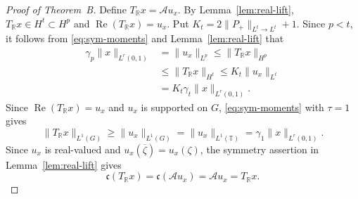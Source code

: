 \documentclass[10pt,a4paper]{amsart}
\newcommand{\T}{\mathbb{T}}
\newcommand{\R}{\mathbb{R}}
\begin{document}
\begin{proof}[Proof of Theorem~B]
Define \(T_{\R}x=\mathcal Au_x\). By
Lemma~\ref{lem:real-lift},
\(T_{\R}x\in H^t\subset H^p\) and
\(\operatorname{Re}(T_{\R}x)=u_x\). Put \(K_t=2\|P_+\|_{L^t\to L^t}+1\).  Since \(p<t\), it follows from
\eqref{eq:sym-moments} and
Lemma~\ref{lem:real-lift} that
\begin{equation}
\label{eq:real-Hp}
\begin{aligned}
        \gamma_p\|x\|_{L^r(0,1)}
        &=
        \|u_x\|_{L^p}
        \le
        \|T_{\R}x\|_{H^p}\\
        &\le
        \|T_{\R}x\|_{H^t}
        \le
        K_t\|u_x\|_{L^t}\\
        &=
        K_t\gamma_t\|x\|_{L^r(0,1)}.
\end{aligned}
\end{equation}
Since \(\operatorname{Re}(T_{\R}x)=u_x\) and \(u_x\) is supported
on \(G\), \eqref{eq:sym-moments} with \(\tau=1\) gives
\begin{equation}
\label{eq:real-local}
        \|T_{\R}x\|_{L^1(G)}
        \ge
        \|u_x\|_{L^1(G)}
        =
        \|u_x\|_{L^1(\T)}
        =
        \gamma_1\|x\|_{L^r(0,1)}.
\end{equation}
Since \(u_x\) is real-valued and
\(u_x(\overline\zeta)=u_x(\zeta)\), the symmetry assertion in
Lemma~\ref{lem:real-lift} gives
\begin{equation}
\label{eq:conj-invariance}
        \mathfrak c(T_{\R}x)
        =
        \mathfrak c(\mathcal Au_x)
        =
        \mathcal Au_x
        =
        T_{\R}x.
\end{equation}


\end{proof}
\end{document}
